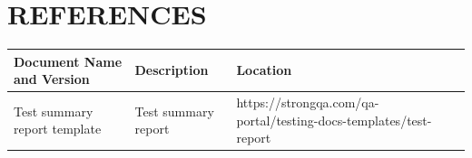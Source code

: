\documentclass[10pt,a4paper,titlepage]{article}
\begin{document}
\section{REFERENCES}
	
\begin{tabular}{ | m{4cm} | m{4cm}| m{4cm} | } 
	\hline
	\textbf{Document Name
	and Version} & \textbf{Description} & \textbf{Location} \\ 
	\hline
	Test summary
	report template & Test summary report & https://strongqa.com/qa-portal/testing-docs-templates/test-report \\ 	
	\hline
\end{tabular}
\end{document}
